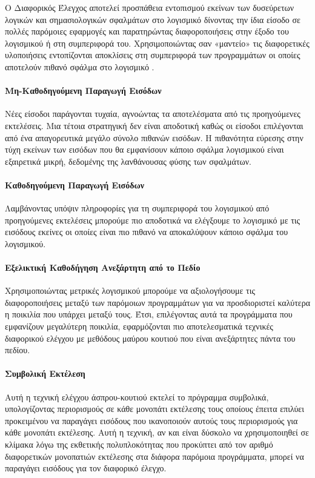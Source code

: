\documentclass[12pt]{article}
\begin{document}
\par Ο Διαφορικός Έλεγχος αποτελεί προσπάθεια εντοπισμού εκείνων των δυσεύρετων λογικών και σημασιολογικών σφαλμάτων στο λογισμικό δίνοντας την ίδια είσοδο σε πολλές παρόμοιες εφαρμογές και παρατηρώντας διαφοροποιήσεις στην έξοδο του λογισμικού ή στη συμπεριφορά του. Χρησιμοποιώντας σαν «μαντείο» τις διαφορετικές υλοποιήσεις εντοπίζονται αποκλίσεις στη συμπεριφορά των προγραμμάτων οι οποίες αποτελούν πιθανό σφάλμα στο λογισμικό \cite{william}.

\paragraph{Μη-Καθοδηγούμενη Παραγωγή Εισόδων}
Νέες είσοδοι παράγονται τυχαία, αγνοώντας τα αποτελέσματα από τις προηγούμενες εκτελέσεις. Μια τέτοια στρατηγική δεν είναι αποδοτική καθώς οι είσοδοι επιλέγονται από ένα απαγορευτικά μεγάλο σύνολο πιθανών εισόδων. Η πιθανότητα εύρεσης στην τύχη εκείνων των εισόδων που θα εμφανίσουν κάποιο σφάλμα λογισμικού είναι εξαιρετικά μικρή, δεδομένης της λανθάνουσας φύσης των σφαλμάτων.

\paragraph{Καθοδηγούμενη Παραγωγή Εισόδων}
Λαμβάνοντας υπόψιν πληροφορίες για τη συμπεριφορά του λογισμικού από προηγούμενες εκτελέσεις μπορούμε πιο αποδοτικά να ελέγξουμε το λογισμικό με τις εισόδους εκείνες οι οποίες είναι πιο πιθανό να αποκαλύψουν κάποιο σφάλμα του λογισμικού.

\paragraph{Εξελικτική Καθοδήγηση Ανεξάρτητη από το Πεδίο}
Χρησιμοποιώντας μετρικές λογισμικού μπορούμε να αξιολογήσουμε τις διαφοροποιήσεις μεταξύ των παρόμοιων προγραμμάτων για να προσδιοριστεί καλύτερα η ποικιλία που υπάρχει μεταξύ τους. Έτσι, επιλέγοντας αυτά τα προγράμματα που εμφανίζουν μεγαλύτερη ποικιλία, εφαρμόζονται πιο αποτελεσματικά τεχνικές διαφορικού ελέγχου με μεθόδους μαύρου κουτιού που είναι ανεξάρτητες πάντα του πεδίου.

\paragraph{Συμβολική Εκτέλεση}
Αυτή η τεχνική ελέγχου άσπρου-κουτιού εκτελεί το πρόγραμμα συμβολικά, υπολογίζοντας περιορισμούς σε κάθε μονοπάτι εκτέλεσης τους οποίους έπειτα επιλύει προκειμένου να παραγάγει εισόδους που ικανοποιούν αυτούς τους περιορισμούς για κάθε μονοπάτι εκτέλεσης. Αυτή η τεχνική, αν και είναι δύσκολο να χρησιμοποιηθεί σε κλίμακα λόγω της εκθετικής πολυπλοκότητας που προκύπτει από τον αριθμό διαφορετικών μονοπατιών εκτέλεσης στα διάφορα παρόμοια προγράμματα, μπορεί να παραγάγει εισόδους για τον διαφορικό έλεγχο.
\end{document}
